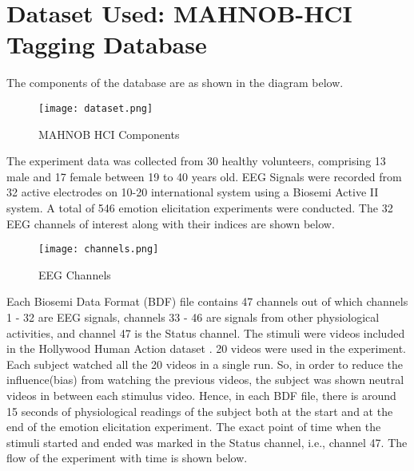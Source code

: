 
\chapter{Dataset Used: MAHNOB-HCI Tagging Database} %

\label{Chapter4} %


The components of the database are as shown in the diagram below.

\begin{figure}[H]
\centering
\texttt{[image: dataset.png]}
\caption{MAHNOB HCI Components}
\label{fig-4-1}
\end{figure}

The experiment data was collected from 30 healthy volunteers, comprising 13 male and 17 female between 19 to 40 years old. EEG Signals were recorded from 32 active electrodes on 10-20 international system using a Biosemi Active II system. A total of 546 emotion elicitation experiments were conducted. The 32 EEG channels of interest along with their indices are shown below.

\begin{figure}[H]
\centering
\texttt{[image: channels.png]}
\caption{EEG Channels}
\label{fig-4-2}
\end{figure}

Each Biosemi Data Format (BDF) file contains 47 channels out of which channels 1 - 32 are EEG signals, channels 33 - 46 are signals from other physiological activities, and channel 47 is the Status channel. The stimuli were videos included in the Hollywood Human Action dataset \cite{holly}. 20 videos were used in the experiment. Each subject watched all the 20 videos in a single run. So, in order to reduce the influence(bias) from watching the previous videos, the subject was shown neutral videos in between each stimulus video. Hence, in each BDF file, there is around 15 seconds of physiological readings of the subject both at the start and at the end of the emotion elicitation experiment. The exact point of time when the stimuli started and ended was marked in the Status channel, i.e., channel 47. The flow of the experiment with time is shown below.

